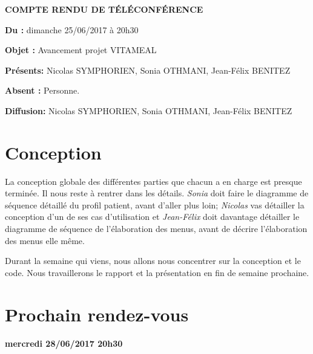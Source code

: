 \documentclass[11pt,a4paper,french,twoside,openright]{article}
\begin{document}
\pagestyle{fancy}

\begin{center}\bfseries\Huge
COMPTE RENDU DE TÉLÉCONFÉRENCE
\end{center}

\textbf{Du      :} dimanche 25/06/2017 à 20h30

\textbf{Objet   :} Avancement projet VITAMEAL

\textbf{Présents:} Nicolas SYMPHORIEN, Sonia OTHMANI, Jean-Félix BENITEZ

\textbf{Absent :} Personne.

\textbf{Diffusion:} Nicolas SYMPHORIEN, Sonia OTHMANI, Jean-Félix BENITEZ

\hrulefill

\section{Conception}
La conception globale des différentes parties que chacun a en charge est presque terminée. Il nous reste à rentrer dans les détails. \emph{Sonia} doit faire le diagramme de séquence détaillé du profil patient, avant d'aller plus loin; \emph{Nicolas} vas détailler la conception d'un de ses cas d'utilisation et \emph{Jean-Félix} doit davantage détailler le diagramme de séquence de l'élaboration des menus, avant de décrire l'élaboration des menus elle même.

Durant la semaine qui viens, nous allons nous concentrer sur la conception et le code. Nous travaillerons le rapport et la présentation en fin de semaine prochaine.

\section{Prochain rendez-vous}
\textbf{mercredi 28/06/2017 20h30}

\label{LastPage}
\end{document}
